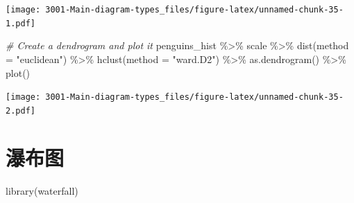 \documentclass[
]{book}
\newenvironment{Shaded}{\begin{snugshade}}{\end{snugshade}}
\newcommand{\AttributeTok}[1]{\textcolor[rgb]{0.77,0.63,0.00}{#1}}
\newcommand{\CommentTok}[1]{\textcolor[rgb]{0.56,0.35,0.01}{\textit{#1}}}
\newcommand{\FunctionTok}[1]{\textcolor[rgb]{0.00,0.00,0.00}{#1}}
\newcommand{\NormalTok}[1]{#1}
\newcommand{\SpecialCharTok}[1]{\textcolor[rgb]{0.00,0.00,0.00}{#1}}
\newcommand{\StringTok}[1]{\textcolor[rgb]{0.31,0.60,0.02}{#1}}
\begin{document}
\texttt{[image: 3001-Main-diagram-types\_files/figure-latex/unnamed-chunk-35-1.pdf]}

\begin{Shaded}
\begin{Highlighting}[]
\CommentTok{\# Create a dendrogram and plot it}
\NormalTok{penguins\_hist }\SpecialCharTok{\%\textgreater{}\%}  
\NormalTok{  scale }\SpecialCharTok{\%\textgreater{}\%} 
  \FunctionTok{dist}\NormalTok{(}\AttributeTok{method =} \StringTok{"euclidean"}\NormalTok{) }\SpecialCharTok{\%\textgreater{}\%}
  \FunctionTok{hclust}\NormalTok{(}\AttributeTok{method =} \StringTok{"ward.D2"}\NormalTok{) }\SpecialCharTok{\%\textgreater{}\%} 
  \FunctionTok{as.dendrogram}\NormalTok{() }\SpecialCharTok{\%\textgreater{}\%}
  \FunctionTok{plot}\NormalTok{()}
\end{Highlighting}
\end{Shaded}

\texttt{[image: 3001-Main-diagram-types\_files/figure-latex/unnamed-chunk-35-2.pdf]}

\hypertarget{ux7011ux5e03ux56fe}{%
\section{瀑布图}\label{ux7011ux5e03ux56fe}}

\begin{Shaded}
\begin{Highlighting}[]
\FunctionTok{library}\NormalTok{(waterfall)}
\end{Highlighting}
\end{Shaded}
\end{document}
